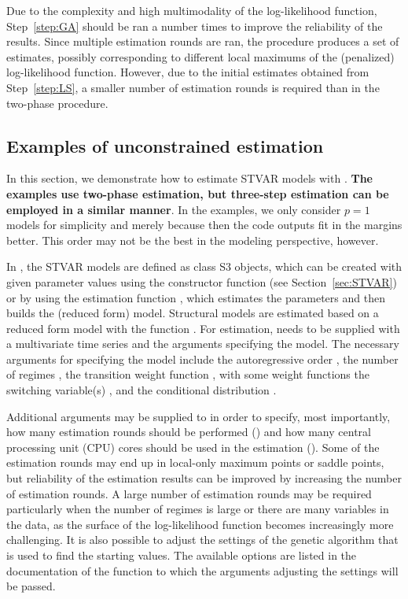 \documentclass[nojss]{jss}
\begin{document}
Due to the complexity and high multimodality of the log-likelihood function, Step~\ref{step:GA} should be ran a number times to improve the reliability of the results. Since multiple estimation rounds are ran, the procedure produces a set of estimates, possibly corresponding to different local maximums of the (penalized) log-likelihood function. However, due to the initial estimates obtained from Step~\ref{step:LS}, a smaller number of estimation rounds is required than in the two-phase procedure.


\subsection{Examples of unconstrained estimation}\label{sec:example_estim}

In this section, we demonstrate how to estimate STVAR models with . \textbf{The examples use two-phase estimation, but three-step estimation can be employed in a similar manner}. In the examples, we only consider $p=1$ models for simplicity and merely because then the code outputs fit in the margins better. This order may not be the best in the modeling perspective, however.

In , the STVAR models are defined as class  S3 objects, which can be created with given parameter values using the constructor function  (see Section~\ref{sec:STVAR}) or by using the estimation function , which estimates the parameters and then builds the (reduced form) model. Structural models are estimated based on a reduced form model with the function . For estimation,  needs to be supplied with a multivariate time series and the arguments specifying the model. The necessary arguments for specifying the model include the autoregressive order , the number of regimes , the transition weight function , with some weight functions the switching variable(s) , and the conditional distribution .

Additional arguments may be supplied to  in order to specify, most importantly, how many estimation rounds should be performed () and how many central processing unit (CPU) cores should be used in the estimation (). Some of the estimation rounds may end up in local-only maximum points or saddle points, but reliability of the estimation results can be improved by increasing the number of estimation rounds. A large number of estimation rounds may be required particularly when the number of regimes is large or there are many variables in the data, as the surface of the log-likelihood function becomes increasingly more challenging. It is also possible to adjust the settings of the genetic algorithm that is used to find the starting values. The available options are listed in the documentation of the function  to which the arguments adjusting the settings will be passed.
\end{document}
